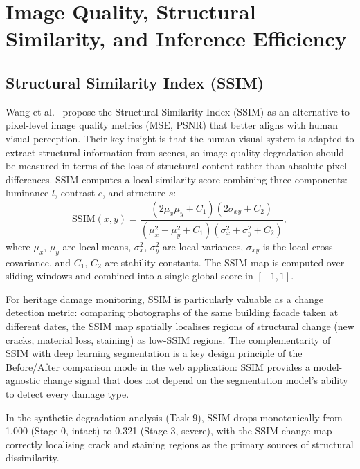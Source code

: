 \documentclass[12pt,a4paper]{article}
\begin{document}
\section{Image Quality, Structural Similarity, and Inference Efficiency}
\label{sec:quality}

\subsection{Structural Similarity Index (SSIM)}

Wang et al.~\cite{wang2004ssim} propose the Structural Similarity Index (SSIM) as an alternative to pixel-level image quality metrics (MSE, PSNR) that better aligns with human visual perception. Their key insight is that the human visual system is adapted to extract structural information from scenes, so image quality degradation should be measured in terms of the loss of structural content rather than absolute pixel differences. SSIM computes a local similarity score combining three components: luminance $l$, contrast $c$, and structure $s$:
\begin{equation}
  \text{SSIM}(x,y) = \frac{(2\mu_x\mu_y + C_1)(2\sigma_{xy} + C_2)}{(\mu_x^2 + \mu_y^2 + C_1)(\sigma_x^2 + \sigma_y^2 + C_2)},
\end{equation}
where $\mu_x$, $\mu_y$ are local means, $\sigma_x^2$, $\sigma_y^2$ are local variances, $\sigma_{xy}$ is the local cross-covariance, and $C_1$, $C_2$ are stability constants. The SSIM map is computed over sliding windows and combined into a single global score in $[-1, 1]$.

For heritage damage monitoring, SSIM is particularly valuable as a change detection metric: comparing photographs of the same building facade taken at different dates, the SSIM map spatially localises regions of structural change (new cracks, material loss, staining) as low-SSIM regions. The complementarity of SSIM with deep learning segmentation is a key design principle of the Before/After comparison mode in the web application: SSIM provides a model-agnostic change signal that does not depend on the segmentation model's ability to detect every damage type.

In the synthetic degradation analysis (Task 9), SSIM drops monotonically from 1.000 (Stage 0, intact) to 0.321 (Stage 3, severe), with the SSIM change map correctly localising crack and staining regions as the primary sources of structural dissimilarity.
\end{document}
